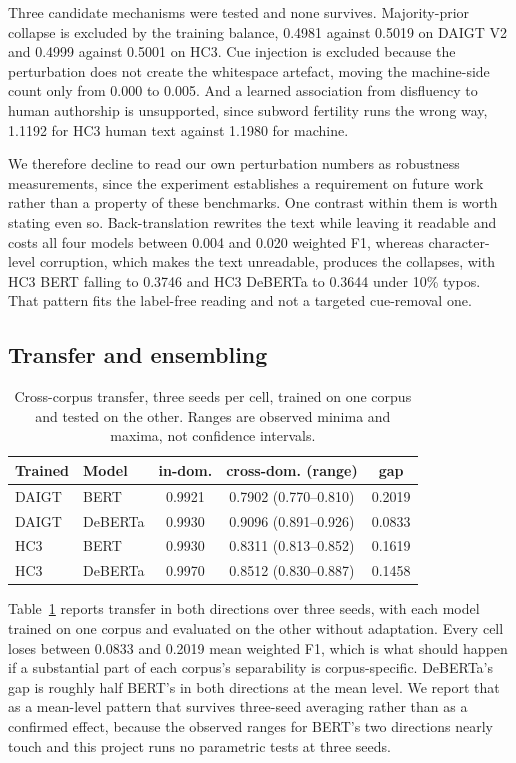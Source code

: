 \documentclass[conference,a4paper]{IEEEtran}
\begin{document}
Three candidate mechanisms were tested and none survives. Majority-prior collapse is excluded by the training balance, 0.4981 against 0.5019 on DAIGT V2 and 0.4999 against 0.5001 on HC3. Cue injection is excluded because the perturbation does not create the whitespace artefact, moving the machine-side count only from 0.000 to 0.005. And a learned association from disfluency to human authorship is unsupported, since subword fertility runs the wrong way, 1.1192 for HC3 human text against 1.1980 for machine.

We therefore decline to read our own perturbation numbers as robustness measurements, since the experiment establishes a requirement on future work rather than a property of these benchmarks. One contrast within them is worth stating even so. Back-translation rewrites the text while leaving it readable and costs all four models between 0.004 and 0.020 weighted F1, whereas character-level corruption, which makes the text unreadable, produces the collapses, with HC3 BERT falling to 0.3746 and HC3 DeBERTa to 0.3644 under 10\% typos. That pattern fits the label-free reading and not a targeted cue-removal one.

\subsection{Transfer and ensembling}

\begin{table}[!ht]
\centering
\caption{Cross-corpus transfer, three seeds per cell, trained on one corpus and tested on the other. Ranges are observed minima and maxima, not confidence intervals.}
\label{tab:cross}
\footnotesize
\setlength{\tabcolsep}{3.5pt}
\begin{tabular}{@{}llccc@{}}
\toprule
Trained & Model & in-dom. & cross-dom. (range) & gap \\
\midrule
DAIGT & BERT & 0.9921 & 0.7902 (0.770--0.810) & 0.2019 \\
DAIGT & DeBERTa & 0.9930 & 0.9096 (0.891--0.926) & 0.0833 \\
HC3 & BERT & 0.9930 & 0.8311 (0.813--0.852) & 0.1619 \\
HC3 & DeBERTa & 0.9970 & 0.8512 (0.830--0.887) & 0.1458 \\
\bottomrule
\end{tabular}
\end{table}

Table~\ref{tab:cross} reports transfer in both directions over three seeds, with each model trained on one corpus and evaluated on the other without adaptation. Every cell loses between 0.0833 and 0.2019 mean weighted F1, which is what should happen if a substantial part of each corpus's separability is corpus-specific. DeBERTa's gap is roughly half BERT's in both directions at the mean level. We report that as a mean-level pattern that survives three-seed averaging rather than as a confirmed effect, because the observed ranges for BERT's two directions nearly touch and this project runs no parametric tests at three seeds.
\end{document}
